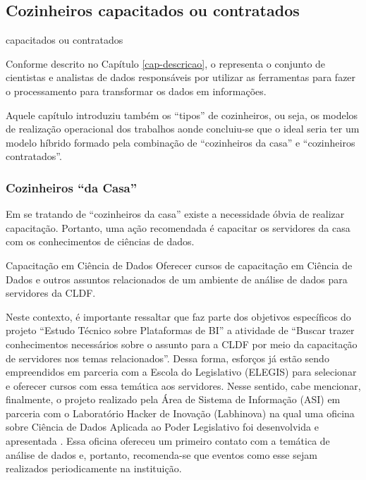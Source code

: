     \subsection{Cozinheiros capacitados ou contratados}

    \begin{env-cenario2}{}
        \mschecknao \xspace \COZINHEIROS \xspace capacitados ou contratados
    \end{env-cenario2}
    
    Conforme descrito no Capítulo \ref{cap-descricao}, o  representa o conjunto de cientistas e analistas de dados responsáveis por utilizar as ferramentas para fazer o processamento para transformar os dados em informações.
    
    Aquele capítulo introduziu também os ``tipos'' de cozinheiros, ou seja, os modelos de realização operacional dos trabalhos aonde concluiu-se que o ideal seria ter um modelo híbrido formado pela combinação de ``cozinheiros da casa'' e ``cozinheiros contratados''.
    
    \subsubsection*{Cozinheiros ``da Casa''}
    
    Em se tratando de ``cozinheiros da casa'' existe a necessidade óbvia de realizar  capacitação. Portanto, uma ação recomendada é capacitar os servidores da casa com os conhecimentos de ciências de dados.
    
    \begin{env-proposta}{Capacitação em Ciência de Dados}
        \nohyphens{Oferecer cursos de capacitação em Ciência de Dados e outros assuntos relacionados de um ambiente de análise de dados para servidores da CLDF.}
    \end{env-proposta}    
    
    Neste contexto, é importante ressaltar que faz parte dos objetivos específicos do projeto ``Estudo Técnico sobre Plataformas de BI'' a atividade de ``Buscar trazer conhecimentos necessários sobre o assunto para a CLDF por meio da capacitação de servidores nos temas relacionados''. 
    Dessa forma, esforços já estão sendo empreendidos em parceria com a Escola do Legislativo (ELEGIS) para selecionar e oferecer cursos com essa temática aos servidores. 
    Nesse sentido, cabe mencionar, finalmente, o projeto realizado pela Área de Sistema de Informação (ASI) em parceria com o Laboratório Hacker de Inovação (Labhinova) na qual uma oficina sobre Ciência de Dados Aplicada ao Poder Legislativo foi desenvolvida e apresentada \cite{asi:oficina}. Essa oficina ofereceu um primeiro contato com a temática de análise de dados e, portanto, recomenda-se que eventos como esse sejam realizados periodicamente na instituição. 

